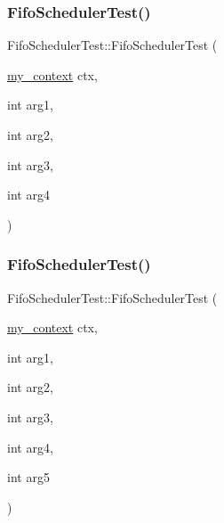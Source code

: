 \mbox{\label{struct_fifo_scheduler_test_aeebfc2353f55b8120cb887814b16a72c}} 
\subsubsection{\texorpdfstring{Fifo\+Scheduler\+Test()}{FifoSchedulerTest()}\hspace{0.1cm}{\footnotesize\ttfamily [5/7]}}
{\footnotesize\ttfamily Fifo\+Scheduler\+Test\+::\+Fifo\+Scheduler\+Test (\begin{DoxyParamCaption}\item[{\mbox{\hyperlink{classboost_1_1statechart_1_1event__processor_a99f1c6ec8419ec82f140c5c93c5eb8cd}{my\+\_\+context}}}]{ctx,  }\item[{int}]{arg1,  }\item[{int}]{arg2,  }\item[{int}]{arg3,  }\item[{int}]{arg4 }\end{DoxyParamCaption})\hspace{0.3cm}{\ttfamily [inline]}}

\mbox{\label{struct_fifo_scheduler_test_a9114b2e58163bbe2bf1d947b685ccafa}} 
\subsubsection{\texorpdfstring{Fifo\+Scheduler\+Test()}{FifoSchedulerTest()}\hspace{0.1cm}{\footnotesize\ttfamily [6/7]}}
{\footnotesize\ttfamily Fifo\+Scheduler\+Test\+::\+Fifo\+Scheduler\+Test (\begin{DoxyParamCaption}\item[{\mbox{\hyperlink{classboost_1_1statechart_1_1event__processor_a99f1c6ec8419ec82f140c5c93c5eb8cd}{my\+\_\+context}}}]{ctx,  }\item[{int}]{arg1,  }\item[{int}]{arg2,  }\item[{int}]{arg3,  }\item[{int}]{arg4,  }\item[{int}]{arg5 }\end{DoxyParamCaption})\hspace{0.3cm}{\ttfamily [inline]}}


